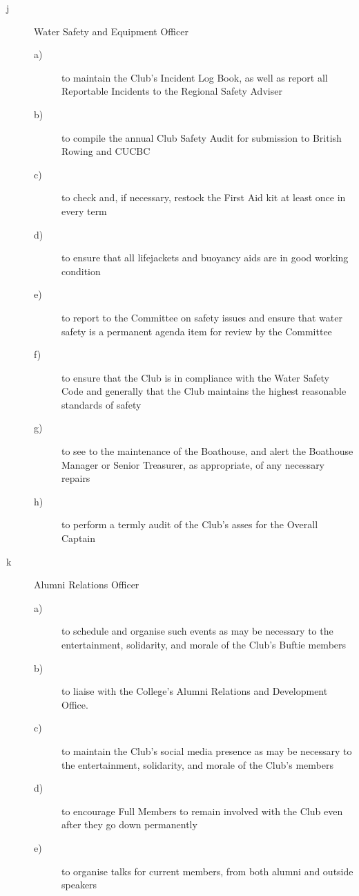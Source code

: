 \documentclass{article}
\begin{document}
\begin{description}
\begin{description}
\begin{description}
		\item[j] Water Safety and Equipment Officer
		\begin{description}
			\item[a)] to maintain the Club’s Incident Log Book, as well as report all
			Reportable Incidents to the Regional Safety Adviser
			\item[b)] to compile the annual Club Safety Audit for submission to
			British Rowing and CUCBC
			\item[c)] to check and, if necessary, restock the First Aid kit at least once
			in every term
			\item[d)] to ensure that all lifejackets and buoyancy aids are in good
			working condition
			\item[e)] to report to the Committee on safety issues and ensure that
			water safety is a permanent agenda item for review by the
			Committee
			\item[f)] to ensure that the Club is in compliance with the Water Safety
			Code and generally that the Club maintains the highest
			reasonable standards of safety
			\item[g)] to see to the maintenance of the Boathouse, and alert the
			Boathouse Manager or Senior Treasurer, as appropriate, of any
			necessary repairs
			\item[h)] to perform a termly audit of the Club’s asses for the Overall
			Captain
		\end{description}
	
		\item[k] Alumni Relations Officer
		\begin{description}
			\item[a)] to schedule and organise such events as may be
			necessary to the entertainment, solidarity, and morale of
			the Club’s Buftie members
			\item[b)] to liaise with the College’s Alumni Relations and Development
			Office.
			\item[c)] to maintain the Club’s social media presence as may be
			necessary to the entertainment, solidarity, and morale of
			the Club’s members
			\item[d)] to encourage Full Members to remain involved with the Club
			even after they go down permanently
			\item[e)] to organise talks for current members, from both alumni and
			outside speakers
		\end{description}
	

\end{description}
\end{description}
\end{description}
\end{document}
